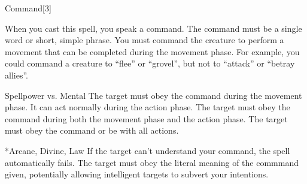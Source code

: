 \begin{spellsection}{Command}[3]
    \begin{spellheader}
    \end{spellheader}
    \begin{spellcontent}
        \begin{spelltargetinginfo}
        \end{spelltargetinginfo}
        \begin{spelleffects}
            \spellspecial When you cast this spell, you speak a command.
            The command must be a single word or short, simple phrase.
            You must command the creature to perform a movement that can be completed during the movement phase.
            For example, you could command a creature to ``flee'' or ``grovel'', but not to ``attack'' or ``betray allies''.
            \begin{spellattack}{Spellpower vs. Mental}
                \spellsuccess The target must obey the command during the movement phase.
                It can act normally during the action phase.
                \spellcritical The target must obey the command during both the movement phase and the action phase.
                \spellfailure The target must obey the command or be \impaired with all actions.
            \end{spellattack}
            \spelldur \durbrief
        \end{spelleffects}
    \end{spellcontent}
    \begin{spellfooter}
        *{Arcane, Divine, Law}
        \spellnotes If the target can't understand your command, the spell automatically fails. The target must obey the literal meaning of the commmand given, potentially allowing intelligent targets to subvert your intentions.
        \miscastrandom
    \end{spellfooter}
\end{spellsection}

